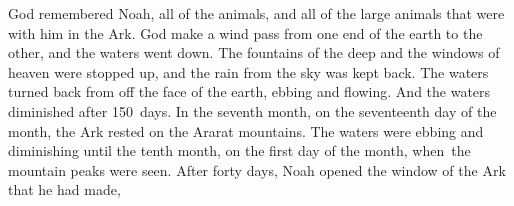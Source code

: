 
\begin{inparaenum}
     God remembered Noah, all of the animals, and all of the large animals that were with him in the Ark. God make a wind pass from one end of the earth to the other, and the waters went down.%
     The fountains of the deep and the windows of heaven were stopped up, and the rain from the sky was kept back.%
     The waters turned back from off the face of the earth, ebbing and flowing. And the waters diminished after 150~days.%
     In the seventh month, on the seventeenth day of the month, the Ark rested on the Ararat mountains.%
     The waters were ebbing and diminishing until the tenth month, on the first day of the month, when\understood\ the mountain peaks were seen.%
     After forty days, Noah opened the window of the Ark that he had made,%
\end{inparaenum}
